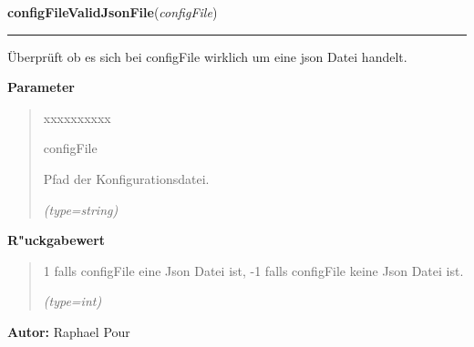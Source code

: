 \hspace{.8\funcindent}\begin{boxedminipage}{\funcwidth}

    \raggedright \textbf{configFileValidJsonFile}(\textit{configFile})

    \vspace{-1.5ex}

    \rule{\textwidth}{0.5\fboxrule}
\setlength{\parskip}{2ex}
    Überprüft ob es sich bei configFile wirklich um eine json Datei 
    handelt.

\setlength{\parskip}{1ex}
      \textbf{Parameter}
      \vspace{-1ex}

      \begin{quote}
        \begin{Ventry}{xxxxxxxxxx}

          \item[configFile]

          Pfad der Konfigurationsdatei.

            {\it (type=string)}

        \end{Ventry}

      \end{quote}

      \textbf{R"uckgabewert}
    \vspace{-1ex}

      \begin{quote}
      1 falls configFile eine Json Datei ist, -1 falls configFile keine 
      Json Datei ist.

      {\it (type=int)}

      \end{quote}

\textbf{Autor:} Raphael Pour



    \end{boxedminipage}

    \label{ledleuchtturm:fileFunc:createStdConf}

    \vspace{0.5ex}

